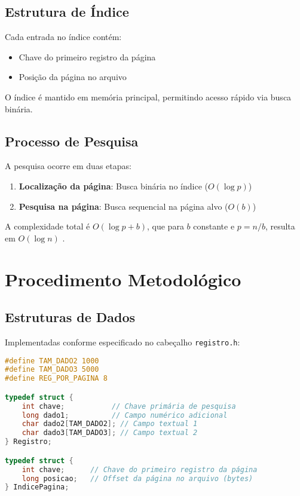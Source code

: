 \documentclass[12pt,a4paper,brazil]{article}
\begin{document}
\subsection{Estrutura de Índice}
Cada entrada no índice contém:
\begin{itemize}
    \item Chave do primeiro registro da página
    \item Posição da página no arquivo
\end{itemize}
O índice é mantido em memória principal, permitindo acesso rápido via busca binária.

\subsection{Processo de Pesquisa}
A pesquisa ocorre em duas etapas:
\begin{enumerate}
    \item \textbf{Localização da página}: Busca binária no índice (\(O(\log p)\))
    \item \textbf{Pesquisa na página}: Busca sequencial na página alvo (\(O(b)\))
\end{enumerate}

A complexidade total é \(O(\log p + b)\), que para \(b\) constante e \(p = n/b\), resulta em \(O(\log n)\) \cite{cormen2002}.

\section{Procedimento Metodológico}

\subsection{Estruturas de Dados}
Implementadas conforme especificado no cabeçalho \texttt{registro.h}:

\begin{lstlisting}[language=C,caption=Estrutura de Registros]
#define TAM_DADO2 1000
#define TAM_DADO3 5000
#define REG_POR_PAGINA 8 

typedef struct {
    int chave;           // Chave primária de pesquisa
    long dado1;          // Campo numérico adicional
    char dado2[TAM_DADO2]; // Campo textual 1
    char dado3[TAM_DADO3]; // Campo textual 2
} Registro;

typedef struct {
    int chave;      // Chave do primeiro registro da página
    long posicao;   // Offset da página no arquivo (bytes)
} IndicePagina;
\end{lstlisting}
\end{document}
